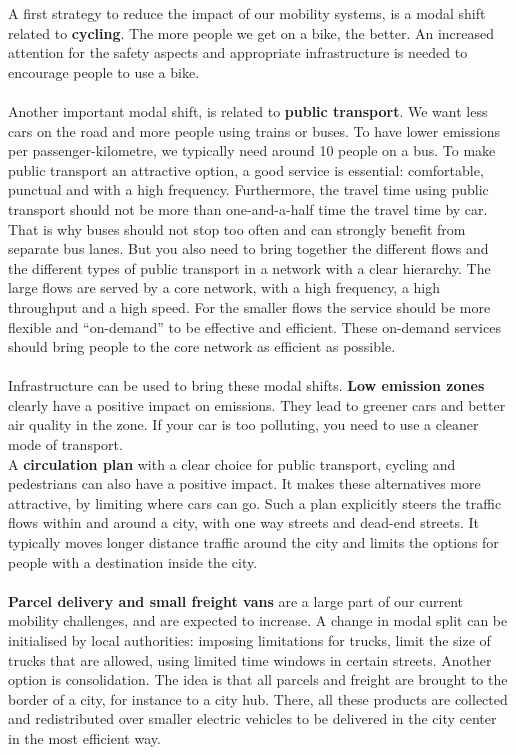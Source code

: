 \documentclass[../summary.tex]{subfiles}
\begin{document}
A first strategy to reduce the impact of our mobility systems, is a modal shift related to \textbf{cycling}. The more people we get on a bike, the better. An increased attention for the safety aspects and appropriate infrastructure is needed to encourage people to use a bike.
\\\\
Another important modal shift, is related to \textbf{public transport}. We want less cars on the road and more people using trains or buses. To have lower emissions per passenger-kilometre, we typically need around 10 people on a bus. To make public transport an attractive option, a good service is essential: comfortable, punctual and with a high frequency. Furthermore, the travel time using public transport should not be more than one-and-a-half time the travel time by car. That is why buses should not stop too often and can strongly benefit from separate bus lanes. But you also need to bring together the different flows and the different types of public transport in a network with a clear hierarchy. The large flows are served by a core network, with a high frequency, a high throughput and a high speed. For the smaller flows the service should be more flexible and “on-demand” to be effective and efficient. These on-demand services should bring people to the core network as efficient as possible.
\\\\
Infrastructure can be used to bring these modal shifts. \textbf{Low emission zones} clearly have a positive impact on emissions. They lead to greener cars and better air quality in the zone. If your car is too polluting, you need to use a cleaner mode of transport.
\\
A \textbf{circulation plan} with a clear choice for public transport, cycling and pedestrians can also have a positive impact. It makes these alternatives more attractive, by limiting where cars can go. Such a plan explicitly steers the traffic flows within and around a city, with one way streets and dead-end streets. It typically moves longer distance traffic around the city and limits the options for people with a destination inside the city.
\\\\
\textbf{Parcel delivery and small freight vans} are a large part of our current mobility challenges, and are expected to increase. A change in modal split can be initialised by local authorities: imposing limitations for trucks, limit the size of trucks that are allowed, using limited time windows in certain streets. Another option is consolidation. The idea is that all parcels and freight are brought to the border of a city, for instance to a city hub. There, all these products are collected and redistributed over smaller electric vehicles to be delivered in the city center in the most efficient way.
\end{document}
